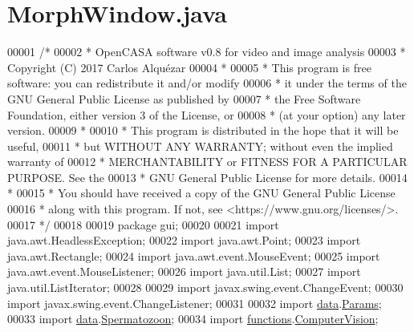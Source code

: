 \hypertarget{_morph_window_8java_source}{}\section{Morph\+Window.\+java}
\label{_morph_window_8java_source}

\begin{DoxyCode}
00001 \textcolor{comment}{/*}
00002 \textcolor{comment}{ *   OpenCASA software v0.8 for video and image analysis}
00003 \textcolor{comment}{ *   Copyright (C) 2017  Carlos Alquézar}
00004 \textcolor{comment}{ *}
00005 \textcolor{comment}{ *   This program is free software: you can redistribute it and/or modify}
00006 \textcolor{comment}{ *   it under the terms of the GNU General Public License as published by}
00007 \textcolor{comment}{ *   the Free Software Foundation, either version 3 of the License, or}
00008 \textcolor{comment}{ *   (at your option) any later version.}
00009 \textcolor{comment}{ *}
00010 \textcolor{comment}{ *   This program is distributed in the hope that it will be useful,}
00011 \textcolor{comment}{ *   but WITHOUT ANY WARRANTY; without even the implied warranty of}
00012 \textcolor{comment}{ *   MERCHANTABILITY or FITNESS FOR A PARTICULAR PURPOSE.  See the}
00013 \textcolor{comment}{ *   GNU General Public License for more details.}
00014 \textcolor{comment}{ *}
00015 \textcolor{comment}{ *   You should have received a copy of the GNU General Public License}
00016 \textcolor{comment}{ *   along with this program.  If not, see <https://www.gnu.org/licenses/>.}
00017 \textcolor{comment}{*/}    
00018 
00019 \textcolor{keyword}{package }gui;
00020 
00021 \textcolor{keyword}{import} java.awt.HeadlessException;
00022 \textcolor{keyword}{import} java.awt.Point;
00023 \textcolor{keyword}{import} java.awt.Rectangle;
00024 \textcolor{keyword}{import} java.awt.event.MouseEvent;
00025 \textcolor{keyword}{import} java.awt.event.MouseListener;
00026 \textcolor{keyword}{import} java.util.List;
00027 \textcolor{keyword}{import} java.util.ListIterator;
00028 
00029 \textcolor{keyword}{import} javax.swing.event.ChangeEvent;
00030 \textcolor{keyword}{import} javax.swing.event.ChangeListener;
00031 
00032 \textcolor{keyword}{import} \hyperlink{namespacedata}{data}.\hyperlink{classdata_1_1_params}{Params};
00033 \textcolor{keyword}{import} \hyperlink{namespacedata}{data}.\hyperlink{classdata_1_1_spermatozoon}{Spermatozoon};
00034 \textcolor{keyword}{import} \hyperlink{namespacefunctions}{functions}.\hyperlink{classfunctions_1_1_computer_vision}{ComputerVision};

\end{DoxyCode}
